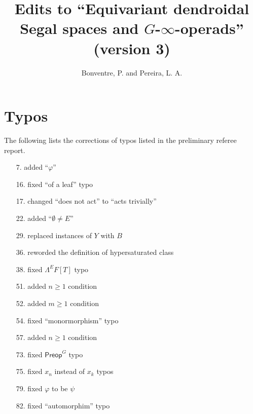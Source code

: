 \documentclass{article}
\begin{document}
 
 
\title{Edits to ``Equivariant dendroidal Segal spaces and $G$-$\infty$-operads'' (version 3)
\\[12pt]} %
 
\author{Bonventre, P. and Pereira, L. A.}
 
\maketitle
 
 
 
 
\section{Typos}
 
The following lists the corrections of typos listed in the preliminary referee report.

\begin{itemize}
\item[7.] added ``$\varphi$''
\item[16.] fixed ``of a leaf'' typo
\item[17.] changed ``does not act'' to ``acts trivially''
\item[22.] added ``$\emptyset \neq E$''
\item[29.] replaced instances of $Y$ with $B$
\item[36.] reworded the definition of hypersaturated class
\item[38.] fixed $\Lambda^EF[T]$ typo
\item[51.] added $n \geq 1$ condition
\item[52.] added $m \geq 1$ condition
\item[54.] fixed ``monormorphism'' typo
\item[57.] added $n \geq 1$ condition
\item[73.] fixed $\mathsf{Preop}^G$ typo
\item[75.] fixed $x_n$ instead of $x_k$ typos
\item[79.] fixed $\varphi$ to be $\psi$
\item[82.] fixed ``automorphim'' typo
\end{itemize}
\end{document}
